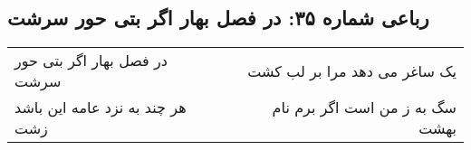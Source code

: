 \begin{center}
\section*{رباعی شماره ۳۵: در فصل بهار اگر بتی حور سرشت}
\label{sec:sh035}
\begin{longtable}{l p{0.5cm} r}
در فصل بهار اگر بتی حور سرشت
&&
یک ساغر می دهد مرا بر لب کشت
\\
هر چند به نزد عامه این باشد زشت
&&
سگ به ز من است اگر برم نام بهشت
\\
\end{longtable}
\end{center}
